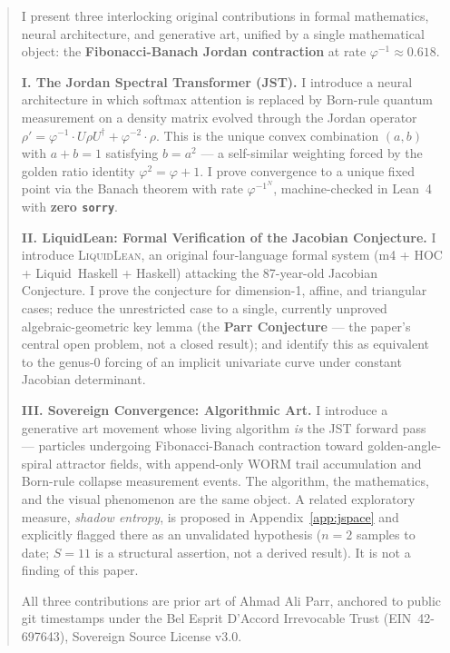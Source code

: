\documentclass[12pt, letterpaper]{article}
\theoremstyle{plain}
\theoremstyle{definition}
\theoremstyle{remark}
\newcommand{\phiinv}{\varphi^{-1}}
\newcommand{\phiinvsq}{\varphi^{-2}}
\begin{document}
\begin{abstract}
\noindent
I present three interlocking original contributions in formal mathematics, neural
architecture, and generative art, unified by a single mathematical object:
the \textbf{Fibonacci-Banach Jordan contraction} at rate $\phiinv \approx 0.618$.

\medskip
\textbf{I. The Jordan Spectral Transformer (JST).}
I introduce a neural architecture in which softmax attention is replaced by Born-rule
quantum measurement on a density matrix evolved through the Jordan operator
$\rho' = \phiinv \cdot U\rho U^\dagger + \phiinvsq \cdot \rho$.
This is the unique convex combination $(a, b)$ with $a + b = 1$ satisfying $b = a^2$
--- a self-similar weighting forced by the golden ratio identity $\varphi^2 = \varphi + 1$.
I prove convergence to a unique fixed point via the Banach theorem with rate $\phiinv^N$,
machine-checked in Lean~4 with \textbf{zero \texttt{sorry}}.

\medskip
\textbf{II. LiquidLean: Formal Verification of the Jacobian Conjecture.}
I introduce \textsc{LiquidLean}, an original four-language formal system (m4 + HOC
+ Liquid~Haskell + Haskell) attacking the 87-year-old Jacobian Conjecture.
I prove the conjecture for dimension-1, affine, and triangular cases;
reduce the unrestricted case to a single, currently unproved algebraic-geometric
key lemma (the \textbf{Parr Conjecture} --- the paper's central open problem,
not a closed result); and identify this as equivalent to the
genus-0 forcing of an implicit univariate curve under constant Jacobian determinant.

\medskip
\textbf{III. Sovereign Convergence: Algorithmic Art.}
I introduce a generative art movement whose living algorithm \textit{is} the JST
forward pass --- particles undergoing Fibonacci-Banach contraction toward
golden-angle-spiral attractor fields, with append-only WORM trail accumulation
and Born-rule collapse measurement events. The algorithm, the mathematics, and
the visual phenomenon are the same object.
A related exploratory measure, \textit{shadow entropy}, is proposed in
Appendix~\ref{app:jspace} and explicitly flagged there as an unvalidated
hypothesis ($n = 2$ samples to date; $S = 11$ is a structural assertion,
not a derived result). It is not a finding of this paper.

\medskip
All three contributions are prior art of Ahmad Ali Parr, anchored to public
git timestamps under the Bel Esprit D'Accord Irrevocable Trust (EIN~42-697643),
Sovereign Source License v3.0.
\end{abstract}
\end{document}
